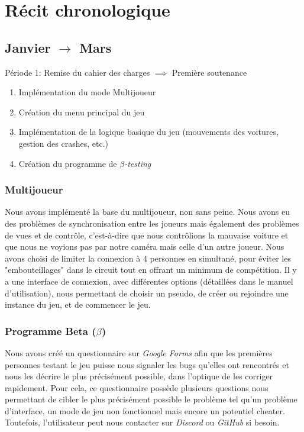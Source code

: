 \documentclass[a4paper,12pt]{article}
\begin{document}
    \section{Récit chronologique}
        \subsection{Janvier $\to$ Mars}
        \begin{description}
    \item Période 1: Remise du cahier des charges \(\implies\) Première soutenance
        \begin{enumerate}
            \item Implémentation du mode Multijoueur
            \item Création du menu principal du jeu
            \item Implémentation de la logique basique du jeu (mouvements des voitures, gestion des crashes, etc.)
            \item Création du programme de \(\beta\)\textit{-testing}
                \\
        \end{enumerate}
    \end{description}
        
            \subsubsection{Multijoueur}
                Nous avons implémenté la base du multijoueur, non sans peine. Nous avons eu des problèmes de 
                synchronisation entre les joueurs mais également des problèmes de vues et de contrôle, c'est-à-dire 
                que nous contrôlions la mauvaise voiture et que nous ne voyions pas par notre caméra mais celle d'un 
                autre joueur. 
                Nous avons choisi de limiter la connexion à 4 personnes en simultané, pour éviter les 
                "embouteillages" dans le circuit tout en offrant un minimum de compétition. Il y a une interface de 
                connexion, avec différentes options (détaillées dans le manuel d'utilisation), nous permettant de 
                choisir un pseudo, de créer ou rejoindre une instance du jeu, et de commencer le jeu.
  
            \subsubsection{Programme Beta (\(\beta\))}
                Nous avons créé un questionnaire sur \textsl{Google Forms} afin que les premières personnes testant
                le jeu puisse nous signaler les bugs qu'elles ont rencontrés et nous les décrire le plus 
                précisément possible, dans l'optique de les corriger rapidement. Pour cela, ce questionnaire 
                possède plusieurs questions nous permettant de cibler le plus précisément possible le problème tel qu'un problème d'interface, un mode de jeu non fonctionnel mais encore un 
                potentiel cheater. 
                Toutefois, l'utilisateur peut nous contacter sur \textsl{Discord} ou \textsl{GitHub} si besoin.
        
\end{document}
